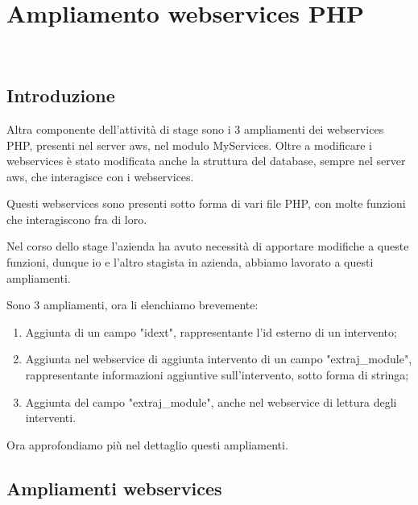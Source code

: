 
\chapter{Ampliamento webservices PHP}
\label{cap:webservices}

\\

\section{Introduzione}
Altra componente dell'attività di stage sono i 3 ampliamenti dei webservices PHP, presenti nel server \gls{aws}, nel modulo MyServices. Oltre a modificare i webservices è stato modificata anche la struttura del database, sempre nel server \gls{aws}, che interagisce con i webservices.

Questi webservices sono presenti sotto forma di vari file PHP, con molte funzioni che interagiscono fra di loro.

Nel corso dello stage l'azienda ha avuto necessità di apportare modifiche a queste funzioni, dunque io e l'altro stagista in azienda, abbiamo lavorato a questi ampliamenti.

Sono 3 ampliamenti, ora li elenchiamo brevemente:
\begin{enumerate}
            \item Aggiunta di un campo "idext", rappresentante l'id esterno di un intervento;
            \item Aggiunta nel webservice di aggiunta intervento di un campo "extraj\_module", rappresentante informazioni aggiuntive sull'intervento, sotto forma di stringa;
            \item Aggiunta del campo "extraj\_module", anche nel webservice di lettura degli interventi.
\end{enumerate}

Ora approfondiamo più nel dettaglio questi ampliamenti.

\newpage

\section{Ampliamenti webservices}
